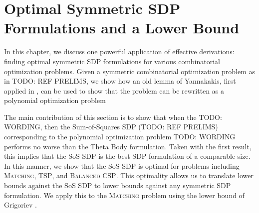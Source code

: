 \chapter{Optimal Symmetric SDP Formulations and a Lower Bound}
In this chapter, we discuss one powerful application of effective derivations: finding optimal symmetric SDP formulations for various combinatorial optimization problems. 
Given a symmetric combinatorial optimization problem as in TODO: REF PRELIMS, we show how an old lemma of Yannakakis, first applied in \cite{}, can be used to show that the problem can be rewritten as a polynomial optimization problem 

The main contribution of this section is to show that when the TODO: WORDING, then the Sum-of-Squares SDP (TODO: REF PRELIMS) corresponding to the polynomial optimization problem TODO: WORDING performs no worse than the Theta Body formulation. Taken with the first result, this implies that the SoS SDP is the best SDP formulation of a comparable size. In this manner, we show that the SoS SDP is optimal for problems including \textsc{Matching}, \textsc{TSP}, and \textsc{Balanced CSP}.  This optimality allows us to translate lower bounds against the SoS SDP to lower bounds against any symmetric SDP formulation. We apply this to the \textsc{Matching} problem using the lower bound of Grigoriev \cite{}. 

